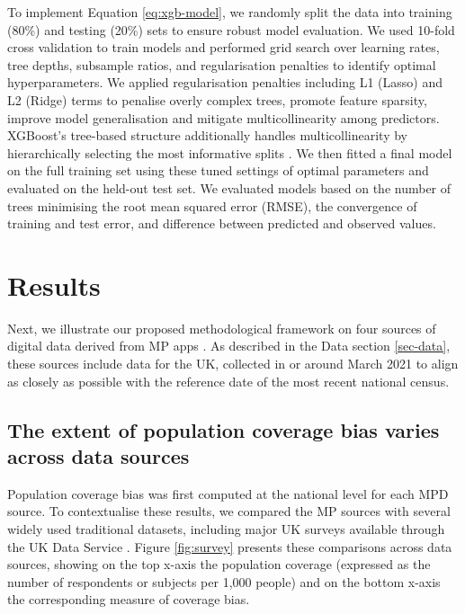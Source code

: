 \documentclass[]{rsos}%
\begin{document}
To implement Equation \ref{eq:xgb-model}, we randomly split the data
into training (80\%) and testing (20\%) sets to ensure robust model
evaluation. We used 10-fold cross validation to train models and
performed grid search over learning rates, tree depths, subsample
ratios, and regularisation penalties to identify optimal
hyperparameters. We applied regularisation penalties including L1
(Lasso) and L2 (Ridge) terms to penalise overly complex trees, promote
feature sparsity, improve model generalisation and mitigate
multicollinearity among predictors. XGBoost's tree-based structure
additionally handles multicollinearity by hierarchically selecting the
most informative splits \citep{chen2016}. We then fitted a final model on the
full training set using these tuned settings of optimal parameters and
evaluated on the held-out test set. We evaluated models based on the
number of trees minimising the root mean squared error (RMSE), the
convergence of training and test error, and difference between predicted
and observed values.

\section{Results}\label{results}

Next, we illustrate our proposed methodological framework on four
sources of digital data derived from MP apps . As
described in the Data section \ref{sec-data}, these sources include
data for the UK, collected in or around March 2021 to align as closely
as possible with the reference date of the most recent national census.

\subsection{The extent of population coverage bias varies across data sources}\label{the-extent-of-population-coverage-bias-varies-across-data-sources}

Population coverage bias was first computed at the national level for
each MPD source. To contextualise these results, we compared the MP
sources with several widely used traditional datasets, including major
UK surveys available through the UK Data Service
\citep{ukdataserviceSurveysData}. Figure \ref{fig:survey} presents these
comparisons across data sources, showing on the top x-axis the
population coverage (expressed as the number of respondents or subjects
per 1,000 people) and on the bottom x-axis the corresponding measure of
coverage bias.
\end{document}
